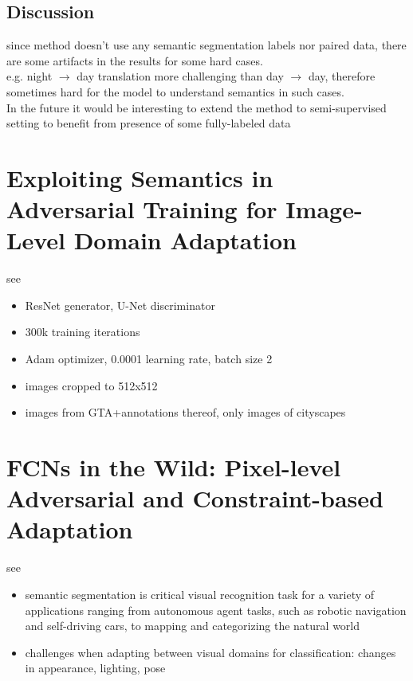 \subsection{Discussion}
since method doesn't use any semantic segmentation labels nor paired data, there are some artifacts in the results for some hard cases.\\
e.g. night $\rightarrow$ day translation more challenging than day $\rightarrow$ day, therefore sometimes hard for the model to understand semantics in such cases.\\
In the future it would be interesting to extend the method to semi-supervised setting to benefit from presence of some fully-labeled data

\section{Exploiting Semantics in Adversarial Training for Image-Level Domain Adaptation}

see \cite{DBLP:journals/corr/abs-1810-05852}

\begin{itemize}
	\item ResNet generator, U-Net discriminator
	\item 300k training iterations
	\item Adam optimizer, 0.0001 learning rate, batch size 2
	\item images cropped to 512x512
	\item images from GTA+annotations thereof, only images of cityscapes
\end{itemize}

\section{FCNs in the Wild: Pixel-level Adversarial and Constraint-based Adaptation}

see \cite{DBLP:journals/corr/HoffmanWYD16}

\begin{itemize}
	\item semantic segmentation is critical visual recognition task for a variety of applications ranging from autonomous agent tasks, such as robotic navigation and self-driving cars, to mapping and categorizing the natural world
	\item challenges when adapting between visual domains for classification: changes in appearance, lighting, pose
\end{itemize}


